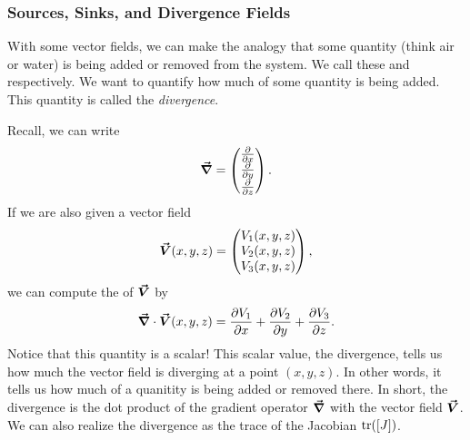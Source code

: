 		        \subsubsection{Sources, Sinks, and Divergence Fields}
		        With some vector fields, we can make the analogy that some quantity (think air or water) is being added or removed from the system.  We call these  and  respectively.  We want to quantify how much of some quantity is being added. This quantity is called the \emph{divergence}.
		        
		        Recall, we can write
		        \[
		        \boldsymbol{\vec{\nabla}} = \begin{pmatrix} \frac{\partial}{\partial x} \\ \frac{\partial}{\partial y} \\ \frac{\partial}{\partial z} \end{pmatrix}.
		        \]
		        If we are also given a vector field
		        \[
		        \boldsymbol{\vec{V}}(x,y,z) = \begin{pmatrix} V_1(x,y,z) \\ V_2(x,y,z) \\ V_3(x,y,z) \end{pmatrix},
		        \]
		        we can compute the  of $\boldsymbol{\vec{V}}$ by
		        \[
		        \boldsymbol{\vec{\nabla}} \cdot \boldsymbol{\vec{V}}(x,y,z) = \frac{\partial V_1}{\partial x} + \frac{\partial V_2}{\partial y} + \frac{\partial V_3}{\partial z}.
		        \]
		        Notice that this quantity is a scalar!  This scalar value, the divergence, tells us how much the vector field is diverging at a point $(x,y,z)$. In other words, it tells us how much of a quanitity is being added or removed there.  In short, the divergence is the dot product of the gradient operator $\boldsymbol{\vec{\nabla}}$ with the vector field $\boldsymbol{\vec{V}}$.  We can also realize the divergence as the trace of the Jacobian $\mathrm{tr}([J])$.  
		        
